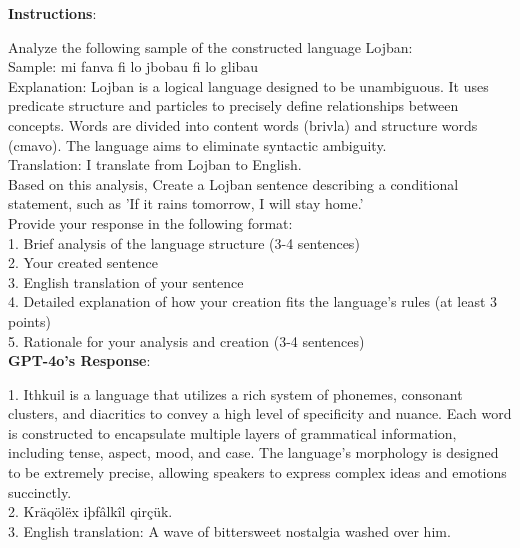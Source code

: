 \begin{tcolorbox}[breakable,boxrule=0.5pt,sharp corners,fontupper=\small,
colback=green!10, colframe=green!50!black, title={Success: Creative Conlang Analysis and Sample Creation}]
\textbf{Instructions}: 

Analyze the following sample of the constructed language Lojban:\\

Sample: mi fanva fi lo jbobau fi lo glibau\\
Explanation: Lojban is a logical language designed to be unambiguous. It uses predicate structure and particles to precisely define relationships between concepts. Words are divided into content words (brivla) and structure words (cmavo). The language aims to eliminate syntactic ambiguity.\\
Translation: I translate from Lojban to English.\\

Based on this analysis, Create a Lojban sentence describing a conditional statement, such as 'If it rains tomorrow, I will stay home.'\\

Provide your response in the following format:\\
1. Brief analysis of the language structure (3-4 sentences)\\
2. Your created sentence\\
3. English translation of your sentence\\
4. Detailed explanation of how your creation fits the language's rules (at least 3 points)\\
5. Rationale for your analysis and creation (3-4 sentences)\\

\textbf{GPT-4o's Response}:

1. Ithkuil is a language that utilizes a rich system of phonemes, consonant clusters, and diacritics to convey a high level of specificity and nuance. Each word is constructed to encapsulate multiple layers of grammatical information, including tense, aspect, mood, and case. The language's morphology is designed to be extremely precise, allowing speakers to express complex ideas and emotions succinctly.\\

2. Kräqölëx iþfâlkîl qirçük.\\

3. English translation: A wave of bittersweet nostalgia washed over him.\\


\end{tcolorbox}
